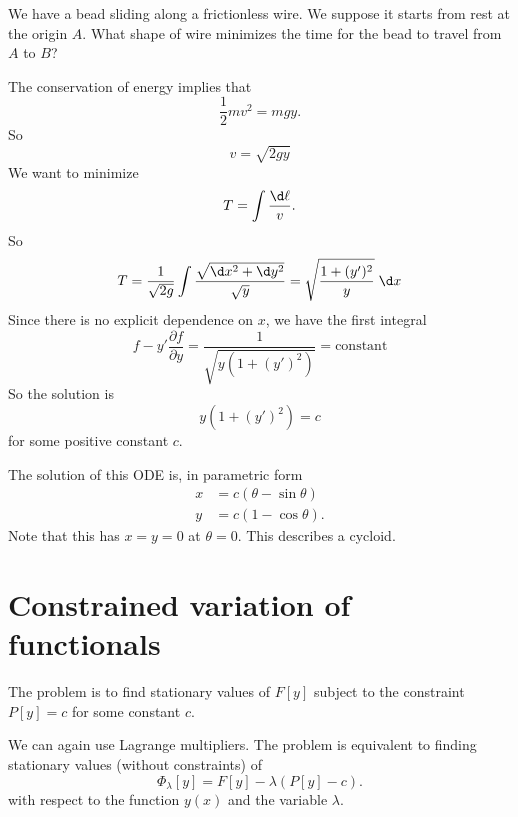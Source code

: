 \documentclass[a4paper]{article}
\begin{document}
\begin{eg}[Branchistochrone]
  We have a bead sliding along a frictionless wire. We suppose it starts from rest at the origin $A$. What shape of wire minimizes the time for the bead to travel from $A$ to $B$?

  \begin{center}
  \end{center}

  The conservation of energy implies that
  \[
    \frac{1}{2}mv^2 = mgy.
  \]
  So
  \[
    v = \sqrt{2gy}
  \]
  We want to minimize
  \[
    T = \int \frac{\d \ell}{v}.
  \]
  So
  \[
    T = \frac{1}{\sqrt{2g}}\int \frac{\sqrt{\d x^2 + \d y^2}}{\sqrt{y}} = \sqrt{\frac{1 + (y')^2}{y}}\;\d x
  \]
  Since there is no explicit dependence on $x$, we have the first integral
  \[
    f - y'\frac{\partial f}{\partial y} = \frac{1}{\sqrt{y(1 + (y')^2)}} = \text{constant}
  \]
  So the solution is
  \[
    y(1 + (y')^2) = c
  \]
  for some positive constant $c$.

  The solution of this ODE is, in parametric form
  \begin{align*}
    x &= c(\theta - \sin \theta)\\
    y &= c(1 - \cos \theta).
  \end{align*}
  Note that this has $x = y = 0$ at $\theta = 0$. This describes a cycloid.
\end{eg}

\section{Constrained variation of functionals}
The problem is to find stationary values of $F[y]$ subject to the constraint $P[y] = c$ for some constant $c$.

We can again use Lagrange multipliers. The problem is equivalent to finding stationary values (without constraints) of
\[
  \Phi_\lambda [y] = F[y] - \lambda(P[y] - c).
\]
with respect to the function $y(x)$ and the variable $\lambda$.
\end{document}
